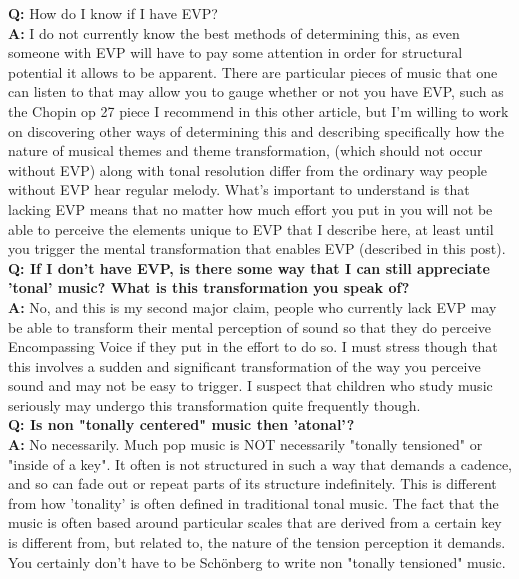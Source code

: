 \documentclass[]{article}
\begin{document}
\textbf{Q:} How do I know if I have EVP?\\

\textbf{A:} I do not currently know the best methods of determining this, as even someone with EVP will have to pay some attention in order for structural potential it allows to be apparent. There are particular pieces of music that one can listen to that may allow you to gauge whether or not you have EVP, such as the Chopin op 27 piece I recommend in this other article, but I'm willing to work on discovering other ways of determining this and describing specifically how the nature of musical themes and theme transformation, (which should not occur without EVP) along with tonal resolution differ from the ordinary way people without EVP hear regular melody. What's important to understand is that lacking EVP means that no matter how much effort you put in you will not be able to perceive the elements unique to EVP that I describe here, at least until you trigger the mental transformation that enables EVP (described in this post).\\

\textbf{Q: If I don't have EVP, is there some way that I can still appreciate 'tonal' music? What is this transformation you speak of?}\\

\textbf{A:} No, and this is my second major claim, people who currently lack EVP may be able to transform their mental perception of sound so that they do perceive Encompassing Voice if they put in the effort to do so. I must stress though that this involves a sudden and significant transformation of the way you perceive sound and may not be easy to trigger. I suspect that children who study music seriously may undergo this transformation quite frequently though.\\

\textbf{Q: Is non "tonally centered" music then 'atonal'?}\\

\textbf{A:} No necessarily. Much pop music is NOT necessarily "tonally tensioned" or "inside of a key". It often is not structured in such a way that demands a cadence, and so can fade out or repeat parts of its structure indefinitely. This is different from how 'tonality' is often defined in traditional tonal music. The fact that the music is often based around particular scales that are derived from a certain key is different from, but related to, the nature of the tension perception it demands. You certainly don't have to be Schönberg to write non "tonally tensioned" music.\\
\end{document}
